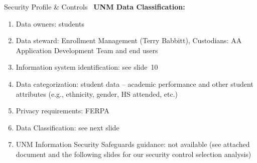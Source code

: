 \documentclass[t]{beamer}   %
\begin{document}
\begin{frame}{Security Profile \& Controls~}%
\vspace*{-0.25in}
\textbf{UNM Data Classification:}
\begin{enumerate}
\item Data owners: students
\pause
\item Data steward: Enrollment Management (Terry Babbitt), Custodians: AA Application Development Team and end users
\pause
\item Information system identification: see slide~10
\pause
\item Data categorization: student data -- academic performance and other student attributes (e.g., ethnicity, gender, HS attended, etc.)
\pause
\item Privacy requirements: FERPA 
\pause
\item Data Classification: see next slide
\pause
\item UNM Information Security Safeguards guidance: not available (see attached document and the following slides for our security control selection analysis)
\end{enumerate}
\end{frame}
\end{document}
